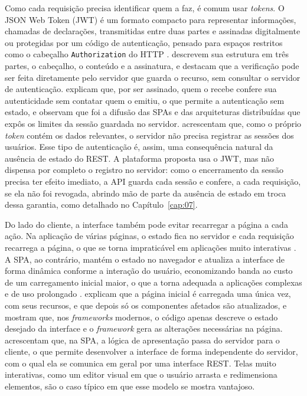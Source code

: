 Como cada requisição precisa identificar quem a faz, é comum usar \textit{tokens}. O JSON Web Token (JWT) é um formato compacto para representar informações,
chamadas de declarações, transmitidas entre duas partes e assinadas digitalmente ou protegidas por um código de autenticação, pensado para espaços restritos
como o cabeçalho \texttt{Authorization} do HTTP \cite{Jones2015jwt}.  descrevem sua estrutura em três partes, o cabeçalho, o
conteúdo e a assinatura, e destacam que a verificação pode ser feita diretamente pelo servidor que guarda o recurso, sem consultar o servidor de autenticação.
 explicam que, por ser assinado, quem o recebe confere sua autenticidade sem contatar quem o emitiu, o que permite a autenticação sem
estado, e observam que foi a difusão das SPAs e das arquiteturas distribuídas que expôs os limites da sessão guardada no servidor.
 acrescentam que, como o próprio \textit{token} contém os dados relevantes, o servidor não precisa registrar as sessões dos
usuários. Esse tipo de autenticação é, assim, uma consequência natural da ausência de estado do REST. A plataforma proposta usa o JWT, mas não
dispensa por completo o registro no servidor: como o encerramento da sessão precisa ter efeito imediato, a API guarda cada sessão e confere, a cada
requisição, se ela não foi revogada, abrindo mão de parte da ausência de estado em troca dessa garantia, como detalhado no Capítulo~\ref{cap:07}.

Do lado do cliente, a interface também pode evitar recarregar a página a cada ação. Na aplicação de várias páginas, o estado fica no servidor e cada
requisição recarrega a página, o que se torna impraticável em aplicações muito interativas \cite{Vepsalainen2024}. A SPA, ao contrário, mantém o
estado no navegador e atualiza a interface de forma dinâmica conforme a interação do usuário, economizando banda ao custo de um carregamento inicial maior, o
que a torna adequada a aplicações complexas e de uso prolongado \cite{Vepsalainen2024}.  explicam que a página
inicial é carregada uma única vez, com seus recursos, e que depois só os componentes afetados são atualizados, e  mostram que,
nos \textit{frameworks} modernos, o código apenas descreve o estado desejado da interface e o \textit{framework} gera as alterações necessárias na página.
 acrescentam que, na SPA, a lógica de apresentação passa do servidor para o cliente, o que permite desenvolver a interface de
forma independente do servidor, com o qual ela se comunica em geral por uma interface REST. Telas muito interativas, como um editor visual em que o usuário
arrasta e redimensiona elementos, são o caso típico em que esse modelo se mostra vantajoso.

